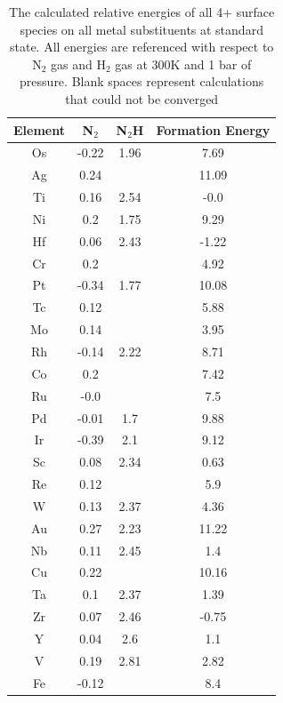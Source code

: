 \begin{table}
\begin{center}
\begin{tabular}{| c | c | c | c |}
\hline
Element & N$_2$ & N$_2$H & Formation Energy \\
\hline
Os & -0.22 & 1.96 & 7.69 \\
Ag & 0.24 &  & 11.09 \\
Ti & 0.16 & 2.54 & -0.0 \\
Ni & 0.2 & 1.75 & 9.29 \\
Hf & 0.06 & 2.43 & -1.22 \\
Cr & 0.2 &  & 4.92 \\
Pt & -0.34 & 1.77 & 10.08 \\
Tc & 0.12 &  & 5.88 \\
Mo & 0.14 &  & 3.95 \\
Rh & -0.14 & 2.22 & 8.71 \\
Co & 0.2 &  & 7.42 \\
Ru & -0.0 &  & 7.5 \\
Pd & -0.01 & 1.7 & 9.88 \\
Ir & -0.39 & 2.1 & 9.12 \\
Sc & 0.08 & 2.34 & 0.63 \\
Re & 0.12 &  & 5.9 \\
W & 0.13 & 2.37 & 4.36 \\
Au & 0.27 & 2.23 & 11.22 \\
Nb & 0.11 & 2.45 & 1.4 \\
Cu & 0.22 &  & 10.16 \\
Ta & 0.1 & 2.37 & 1.39 \\
Zr & 0.07 & 2.46 & -0.75 \\
Y & 0.04 & 2.6 & 1.1 \\
V & 0.19 & 2.81 & 2.82 \\
Fe & -0.12 &  & 8.4 \\
\hline
\end{tabular}
\end{center}
\caption{The calculated relative energies of all 4+ surface species on all metal substituents at standard state. All energies are referenced with respect to N$_2$ gas and H$_2$ gas at 300K and 1 bar of pressure. Blank spaces represent calculations that could not be converged}
\hline
\end{table}

